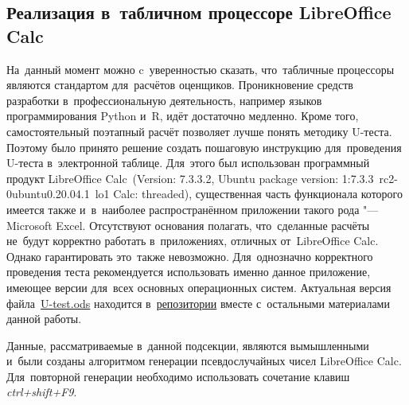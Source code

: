 \documentclass[]{scrartcl}
\begin{document}
\subsection{Реализация в~табличном процессоре LibreOffice Calc}\label{U-test-spreadsheet}
На~данный момент можно c~уверенностью сказать, что~табличные процессоры являются стандартом для~расчётов оценщиков. Проникновение средств разработки в~профессиональную деятельность, например языков программирования Python и~R,  идёт достаточно медленно. Кроме того, самостоятельный поэтапный расчёт позволяет лучше понять методику U-теста. Поэтому было принято решение создать пошаговую инструкцию для~проведения U-теста в~электронной таблице. Для~этого был использован программный продукт LibreOffice Calc~(Version: 7.3.3.2, Ubuntu package version: 1:7.3.3~rc2-0ubuntu0.20.04.1~lo1 Calc: threaded), существенная часть функционала которого имеется также и~в~наиболее распространённом приложении такого рода "--- \foreignlanguage{english}{Microsoft Excel}. Отсутствуют основания полагать, что~сделанные расчёты не~будут корректно работать в~приложениях, отличных от~LibreOffice Calc. Однако гарантировать это~также невозможно. Для~однозначно корректного проведения теста рекомендуется использовать именно данное приложение, имеющее версии для~всех основных операционных систем. Актуальная версия файла~\href{https://github.com/Kirill-Murashev/AI_for_valuers_book/blob/main/Parts-Chapters/Mann-Whitney-Wilcoxon/U-test.ods}{U-test.ods} находится в~\href{https://github.com/Kirill-Murashev/AI_for_valuers_book/tree/main/Parts&Chapters/Mann-Whitney-Wilcoxon}{репозитории} вместе с~остальными материалами данной работы.

Данные, рассматриваемые в~данной подсекции, являются вымышленными и~были созданы алгоритмом генерации псевдослучайных чисел LibreOffice Calc. Для~повторной генерации необходимо использовать сочетание клавиш \emph{ctrl+shift+F9}. 
\end{document}

